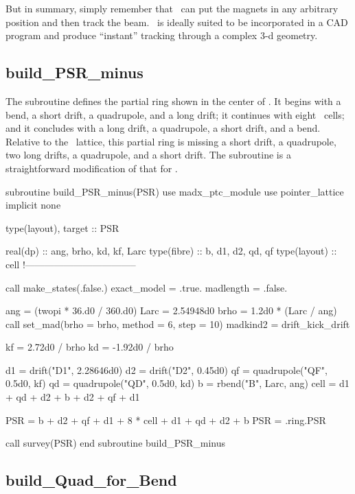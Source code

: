 {But in summary, simply remember that \PTC\ can put the magnets in any arbitrary position and then track the beam. \PTC\ is ideally suited to be incorporated in a CAD program and produce ``instant'' tracking through a complex 3-d geometry.

}
\subsection{build\_PSR\_minus}

%
The subroutine  defines the partial ring shown
in the center of . It begins with a bend, a short
drift, a quadrupole, and a long drift; it continues with eight
\PSR\ cells; and it concludes with a long drift, a quadrupole, a short
drift, and a bend. Relative to the \PSR\ lattice, this partial ring is
missing a short drift, a quadrupole, two long drifts, a quadrupole,
and a short drift. The subroutine is a straightforward modification of
that for .
%

\begin{ptccode}
subroutine  build_PSR_minus(PSR)
use madx_ptc_module
use pointer_lattice
implicit none

type(layout), target :: PSR

real(dp) :: ang, brho, kd, kf, Larc
type(fibre) :: b, d1, d2, qd, qf
type(layout) :: cell
!-----------------------------------

call make_states(.false.)
exact_model = .true.
madlength = .false.

ang = (twopi * 36.d0 / 360.d0)
Larc = 2.54948d0
brho = 1.2d0 * (Larc / ang)
call set_mad(brho = brho, method = 6, step = 10)
madkind2 = drift_kick_drift

kf =  2.72d0 / brho
kd = -1.92d0 / brho

d1 = drift("D1", 2.28646d0)
d2 = drift("D2", 0.45d0)
qf = quadrupole("QF", 0.5d0, kf)
qd = quadrupole("QD", 0.5d0, kd)
b  = rbend("B", Larc, ang)
cell = d1 + qd + d2 + b + d2 + qf + d1

PSR = b + d2 + qf + d1 + 8 * cell + d1 + qd + d2 + b
PSR = .ring.PSR

call survey(PSR)
end subroutine build_PSR_minus
\end{ptccode}


\subsection{build\_Quad\_for\_Bend}

